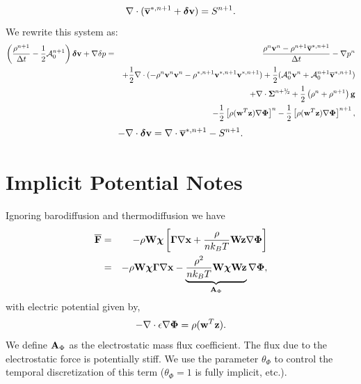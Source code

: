 \documentclass[final]{siamltex}
\newcommand{\sfrac}[2]{\mathchoice
  {\kern0em\raise.5ex\hbox{\the\scriptfont0 #1}\kern-.15em/
   \kern-.15em\lower.25ex\hbox{\the\scriptfont0 #2}}
  {\kern0em\raise.5ex\hbox{\the\scriptfont0 #1}\kern-.15em/
   \kern-.15em\lower.25ex\hbox{\the\scriptfont0 #2}}
  {\kern0em\raise.5ex\hbox{\the\scriptscriptfont0 #1}\kern-.2em/
   \kern-.15em\lower.25ex\hbox{\the\scriptscriptfont0 #2}}
  {#1\!/#2}}
\def\Ab {{\bf A}}
\def\Fb {{\bf F}}
\def\gb {{\bf g}}
\def\vb {{\bf v}}
\def\wb {{\bf w}}
\def\Wb {{\bf W}}
\def\xb {{\bf x}}
\def\zb {{\bf z}}
\def\chib   {\boldsymbol{\chi}}
\def\deltab {\boldsymbol{\delta}}
\def\Gammab {\boldsymbol{\Gamma}}
\def\Phib   {\boldsymbol{\Phi}}
\def\Sigmab {\boldsymbol{\Sigma}}
\def\half   {\frac{1}{2}}
\def\myhalf {\sfrac{1}{2}}
\begin{document}
\begin{equation}
\nabla\cdot(\overline\vb^{*,n+1} + \deltab\vb) = S^{n+1}.
\end{equation}
We rewrite this system as:
\begin{eqnarray}
\left(\frac{\rho^{n+1}}{\Delta t} - \half\mathcal{A}_0^{n+1}\right)\deltab\vb + \nabla\delta p &=& \frac{\rho^n\vb^n-\rho^{n+1}\overline\vb^{*,n+1}}{\Delta t} -\nabla p^n\nonumber\\
&&+ \half\nabla\cdot(-\rho^n\vb^n\vb^n - \rho^{*,n+1}\vb^{*,n+1}\vb^{*,n+1}) + \half(\mathcal{A}_0^n\vb^n + \mathcal{A}_0^{n+1}\overline\vb^{*,n+1} )\nonumber\\
&&+ \nabla\cdot\Sigmab^{n+\myhalf} + \half\left(\rho^n+\rho^{n+1}\right)\gb\nonumber\\
&&- \half\left[\rho(\wb^T\zb)\nabla\Phib\right]^n - \half\left[\rho(\wb^T\zb)\nabla\Phib\right]^{n+1},
\end{eqnarray}
\begin{equation}
-\nabla\cdot\deltab\vb = \nabla\cdot\overline\vb^{*,n+1} - S^{n+1}.
\end{equation}

\section{Implicit Potential Notes}
Ignoring barodiffusion and thermodiffusion we have
\begin{eqnarray}
\overline{\Fb} &=& -\rho\Wb\chib\left[\Gammab\nabla\xb + \frac{\rho}{n k_B T}\Wb\zb\nabla\Phib\right]\nonumber\\
&=& -\rho\Wb\chib\Gammab\nabla\xb - \underbrace{\frac{\rho^2}{nk_B T}\Wb\chib\Wb\zb}_{\Ab_\Phi}\nabla\Phib,
\end{eqnarray}
with electric potential given by,
\begin{equation}
-\nabla\cdot\epsilon\nabla\Phib = \rho(\wb^T\zb).
\end{equation}
We define $\Ab_\Phi$ as the electrostatic mass flux coefficient.
The flux due to the electrostatic force is potentially stiff.  We
use the parameter $\theta_\Phi$ to control the temporal discretization of this term
($\theta_\Phi=1$ is fully implicit, etc.).
\end{document}
